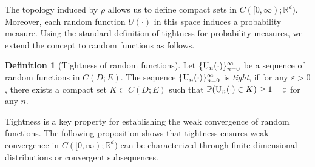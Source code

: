 \documentclass[11pt]{article}
\theoremstyle{plain}
\theoremstyle{definition}
\newtheorem{defn}{Definition}[section]
\def\eps{{\varepsilon}}
\def\RB{{\mathbb R}}
\def\PB{{\mathbb P}}
\newcommand{\uu}{{\textnormal{U}}}
\begin{document}
The topology induced by $\rho$ allows us to define compact sets in $C([0, \infty); \RB^d)$.
Moreover, each random function $U(\cdot)$ in  this space induces a probability measure.
Using the standard definition of tightness for probability measures, we extend the concept to random functions as follows.

\begin{defn}[Tightness of random functions]\label{defn:tight}
Let $\{ \uu_{n}(\cdot) \}_{n=0}^\infty$ be a sequence of random functions in $C(D; E)$.
The sequence $\{ \uu_{n}(\cdot) \}_{n=0}^\infty$ is \textit{tight}, if for any $\eps > 0$, there exists a compact set $K \subset C(D; E)$ 
such that $\PB( \uu_{n}(\cdot) \in K ) \ge 1 - \eps$ for any $n$. 
\end{defn}

Tightness is a key property for establishing the weak convergence of random functions. The following proposition shows that tightness ensures weak convergence in $C([0,\infty); \RB^{d})$ can be characterized through finite-dimensional distributions or convergent subsequences.
\end{document}
